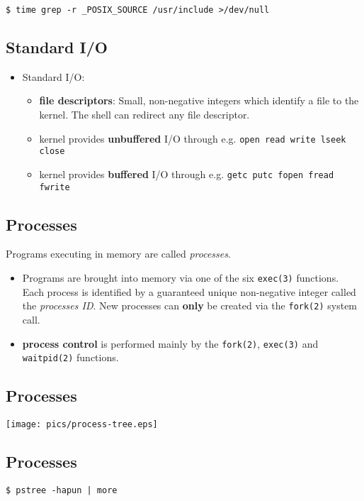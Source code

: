 \documentclass[xga]{xdvislides}
\begin{document}
\vspace*{\fill}
\begin{verbatim}
$ time grep -r _POSIX_SOURCE /usr/include >/dev/null
\end{verbatim}
\vspace*{\fill}

\subsection{Standard I/O}
\begin{itemize}
	\item	Standard I/O:
		\begin{itemize}
			\item {\bf file descriptors}: Small, non-negative
				integers which identify a file to the kernel.
				The shell can redirect any file descriptor.
			\item kernel provides {\bf unbuffered} I/O through e.g.
				{\tt open read write lseek close}
			\item kernel provides {\bf buffered} I/O through e.g.
				{\tt getc putc fopen fread fwrite}
		\end{itemize}
\end{itemize}

\subsection{Processes}
Programs executing in memory are called {\em processes}.
\begin{itemize}
	\item Programs are brought into memory via one of the
		six {\tt exec(3)} functions.  Each process is identified
		by a guaranteed unique non-negative integer called the
		{\em processes ID}. New processes can {\bf only} be
		created via the {\tt fork(2)} system call.
	\item {\bf process control} is performed mainly by the
		{\tt fork(2)}, {\tt exec(3)} and {\tt waitpid(2)} functions.
\end{itemize}

\subsection{Processes}
\begin{center}
\texttt{[image: pics/process-tree.eps]} \\
\end{center}

\subsection{Processes}
\vspace*{\fill}
\Huge
\begin{center}
	{\tt \$ pstree -hapun | more}
\end{center}
\Normalsize
\vspace*{\fill}
\end{document}
